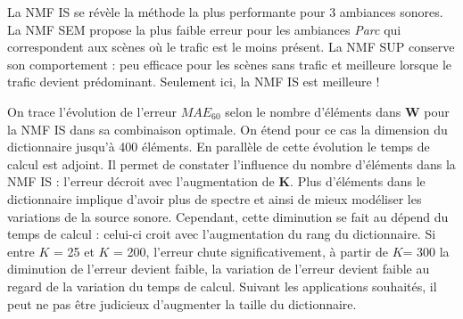 \begin{table}[h]
\centering
\caption{Erreurs $MAE_{60}$ selon les estimateurs NMF pour chaque méthode dans sa combinaison optimale de modalités avec les estimateurs \textit{baseline} à 500 Hz et 20 kHz.}
\label{tab:erreur_mae60_amb}
\end{table}

La NMF IS se révèle la méthode la plus performante pour 3 ambiances sonores. La NMF SEM propose la plus faible erreur pour les ambiances \textit{Parc} qui correspondent aux scènes où le trafic est le moins présent. 
La NMF SUP conserve son comportement : peu efficace pour les scènes sans trafic et meilleure lorsque le trafic devient prédominant. Seulement ici, la NMF IS est meilleure !

On trace l'évolution de l'erreur $MAE_{60}$ selon le nombre d'éléments dans $\mathbf{W}$ pour la NMF IS dans sa combinaison optimale. On étend pour ce cas la dimension du dictionnaire jusqu'à 400 éléments. En parallèle de cette évolution le temps de calcul est adjoint. Il permet de constater l'influence du nombre d'éléments dans la NMF IS : l'erreur décroit avec l'augmentation de $\mathbf{K}$. Plus d'éléments dans le dictionnaire implique d'avoir plus de spectre et ainsi de mieux modéliser les variations de la source sonore. Cependant, cette diminution se fait au dépend du temps de calcul : celui-ci croit avec l'augmentation du rang du dictionnaire. Si entre $K$ = 25 et $K$ = 200, l'erreur chute significativement, à partir de $K$= 300 la diminution de l'erreur devient faible, la variation de l'erreur devient faible au regard de la variation du temps de calcul. Suivant les applications souhaités, il peut ne pas être judicieux d'augmenter la taille du dictionnaire.

